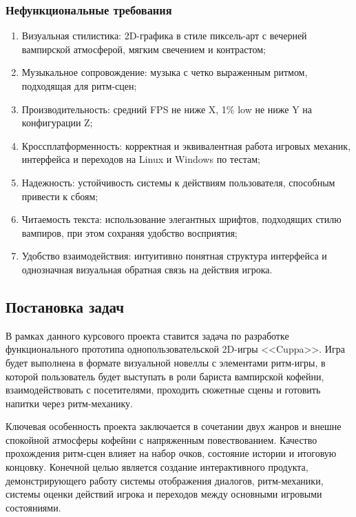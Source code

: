 \documentclass[utf8, russian]{eskdtext}
\numberwithin{equation}{section}
\begin{document}
\subsubsection{Нефункциональные требования}

\begin{enumerate}
    \item Визуальная стилистика: 2D-графика в стиле пиксель-арт с вечерней вампирской атмосферой, мягким свечением и контрастом;
    \item Музыкальное сопровождение: музыка с четко выраженным ритмом, подходящая для ритм-сцен;
    \item Производительность: средний FPS не ниже X, 1\% low не ниже Y на конфигурации Z;
    \item Кроссплатформенность: корректная и эквивалентная работа игровых механик, интерфейса и переходов на Linux и Windows по тестам;
    \item Надежность: устойчивость системы к действиям пользователя, способным привести к сбоям;
    \item Читаемость текста: использование элегантных шрифтов, подходящих стилю вампиров, при этом сохраняя удобство восприятия;
    \item Удобство взаимодействия: интуитивно понятная структура интерфейса и однозначная визуальная обратная связь на действия игрока.
\end{enumerate}

\subsection{Постановка задач}

В рамках данного курсового проекта ставится задача по разработке функционального прототипа однопользовательской 2D-игры <<Cuppa>>. Игра будет выполнена в формате визуальной новеллы с элементами ритм-игры, в которой пользователь будет выступать в роли бариста вампирской кофейни, взаимодействовать с посетителями, проходить сюжетные сцены и готовить напитки через ритм-механику.

Ключевая особенность проекта заключается в сочетании двух жанров и внешне спокойной атмосферы кофейни с напряженным повествованием. Качество прохождения ритм-сцен влияет на набор очков, состояние истории и итоговую концовку. Конечной целью является создание интерактивного продукта, демонстрирующего работу системы отображения диалогов, ритм-механики, системы оценки действий игрока и переходов между основными игровыми состояниями.
\end{document}
